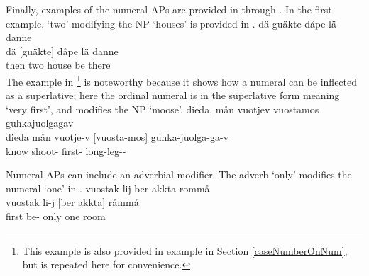Finally, examples of the numeral APs are provided in  through . In the first example,  ‘two’ modifying the NP  ‘houses’ is provided in . 
\ea\label{APstructureEx5}%
\glll	dä guäkte dåpe lä danne\\
	dä {[guäkte]\subAP} dåpe lä danne \\
	then two house\BS{} be\BS{} there\\\nopagebreak
{}	
\z
The example in \footnote{This example is also provided in example  in Section \ref{caseNumberOnNum}, but is repeated here for convenience.} 
is noteworthy because it shows how a numeral can be inflected as a superlative; here the ordinal numeral  is in the superlative form  meaning ‘very first’, and modifies the NP  ‘moose’. 
\ea\label{APstructureEx6}%
\glll	dieda, mån vuotjev vuostamos guhkajuolgagav\\
	dieda mån vuotje-v {[vuosta-mos]\subAP} guhka-juolga-ga-v\\
	know\BS{}  shoot- first- long-leg--\\\nopagebreak
{}	
\z

Numeral APs can include an adverbial modifier. The adverb  ‘only’ modifies the numeral  ‘one’ in .
\ea\label{APstructureEx7}%
\glll	vuostak lij ber akkta rommå\\
	vuostak li-j {[ber} {akkta]\subAP} råmmå\\
	first be- only one room\BS{}\\\nopagebreak
{}	
\z


